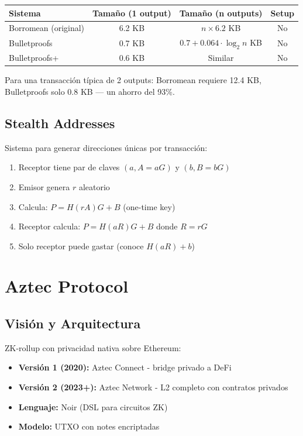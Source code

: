 \documentclass[11pt,a4paper,twoside]{book}
\begin{document}
\begin{center}
\begin{tabular}{lccc}
\toprule
\textbf{Sistema} & \textbf{Tama\~no (1 output)} & \textbf{Tama\~no (n outputs)} & \textbf{Setup} \\
\midrule
Borromean (original) & 6.2 KB & $n \times 6.2$ KB & No \\
Bulletproofs & 0.7 KB & $0.7 + 0.064 \cdot \log_2 n$ KB & No \\
Bulletproofs+ & 0.6 KB & Similar & No \\
\bottomrule
\end{tabular}
\end{center}

Para una transacci\'on t\'ipica de 2 outputs: Borromean requiere 12.4 KB, Bulletproofs solo 0.8 KB --- un ahorro del 93\%.

\subsection{Stealth Addresses}

\begin{definition}
Sistema para generar direcciones \'unicas por transacci\'on:
\begin{enumerate}
    \item Receptor tiene par de claves $(a, A = aG)$ y $(b, B = bG)$
    \item Emisor genera $r$ aleatorio
    \item Calcula: $P = H(rA)G + B$ (one-time key)
    \item Receptor calcula: $P = H(aR)G + B$ donde $R = rG$
    \item Solo receptor puede gastar (conoce $H(aR) + b$)
\end{enumerate}
\end{definition}

\section{Aztec Protocol}
\label{sec:aztec}

\subsection{Visi\'on y Arquitectura}

\begin{definition}[Aztec]
ZK-rollup con privacidad nativa sobre Ethereum:
\begin{itemize}
    \item \textbf{Versi\'on 1 (2020):} Aztec Connect - bridge privado a DeFi
    \item \textbf{Versi\'on 2 (2023+):} Aztec Network - L2 completo con contratos privados
    \item \textbf{Lenguaje:} Noir (DSL para circuitos ZK)
    \item \textbf{Modelo:} UTXO con notes encriptadas
\end{itemize}
\end{definition}
\end{document}
